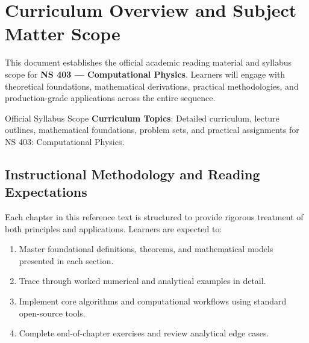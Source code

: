 \section{Curriculum Overview and Subject Matter Scope}

This document establishes the official academic reading material and syllabus scope for \textbf{NS 403 --- Computational Physics}. Learners will engage with theoretical foundations, mathematical derivations, practical methodologies, and production-grade applications across the entire sequence.

\begin{InsightBox}{Official Syllabus Scope}
  \textbf{Curriculum Topics}: Detailed curriculum, lecture outlines, mathematical foundations, problem sets, and practical assignments for NS 403: Computational Physics.
\end{InsightBox}

\subsection{Instructional Methodology and Reading Expectations}

Each chapter in this reference text is structured to provide rigorous treatment of both principles and applications. Learners are expected to:
\begin{enumerate}
  \item Master foundational definitions, theorems, and mathematical models presented in each section.
  \item Trace through worked numerical and analytical examples in detail.
  \item Implement core algorithms and computational workflows using standard open-source tools.
  \item Complete end-of-chapter exercises and review analytical edge cases.
\end{enumerate}

